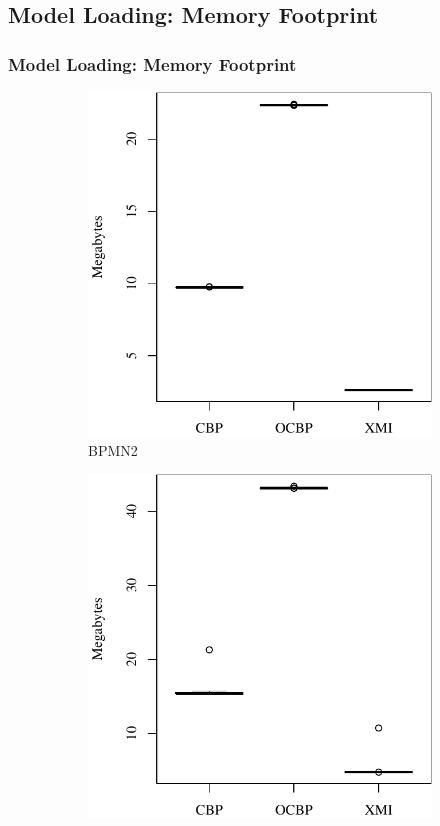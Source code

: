 \documentclass{beamer}
\begin{document}
\begin{frame}[fragile]
\section{Model Loading: Memory Footprint}
\frametitle{Model Loading: Memory Footprint}
\begin{figure}[ht]
    \begin{subfigure}{0.325\textwidth}
        \centering
        \includegraphics[width=\linewidth]{load_memory_bpmn2}
        \caption{BPMN2}
        \label{fig:load_memory_bpmn2}
    \end{subfigure}
    \hfill
    \begin{subfigure}{0.325\textwidth}
        \centering
        \includegraphics[width=\linewidth]{load_memory_epsilon}

\end{subfigure}
\end{figure}
\end{frame}
\end{document}
